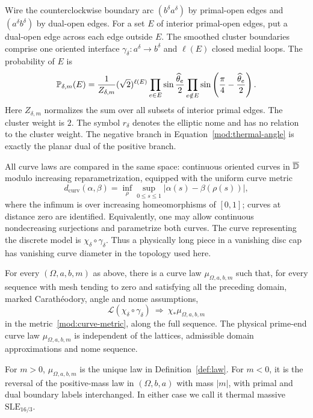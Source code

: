Wire the counterclockwise boundary arc $(b^\delta a^\delta)$ by
primal-open edges and $(a^\delta b^\delta)$ by dual-open edges. For a
set $E$ of interior primal-open edges, put a dual-open edge across each
edge outside $E$. The smoothed cluster boundaries comprise one
oriented interface $\gamma_\delta:a^\delta\to b^\delta$ and
$\ell(E)$ closed medial loops. The probability of $E$ is
\begin{equation}\label{mod:law}
 \mathbb P_{\delta,m}(E)=\frac1{Z_{\delta,m}}(\sqrt2)^{\ell(E)}
 \prod_{e\in E}\sin\frac{\widehat\theta_e}{2}
 \prod_{e\notin E}\sin\left(\frac\pi4-
                                    \frac{\widehat\theta_e}{2}\right).
\end{equation}
Here $Z_{\delta,m}$ normalizes the sum over all subsets of interior
primal edges.
The cluster weight is $2$. The symbol $r_\delta$ denotes the elliptic
nome and has no relation to the cluster weight. The negative branch
in Equation~\eqref{mod:thermal-angle} is exactly the planar dual of
the positive branch.

All curve laws are compared in the same space: continuous oriented
curves in $\overline{\mathbb D}$ modulo increasing reparametrization, equipped
with the uniform curve metric
\begin{equation}\label{mod:curve-metric}
 d_{\mathrm{curv}}(\alpha,\beta)
 =\inf_{\rho}\sup_{0\le s\le1}|\alpha(s)-\beta(\rho(s))|,
\end{equation}
where the infimum is over increasing homeomorphisms of $[0,1]$;
curves at distance zero are identified. Equivalently, one may allow
continuous nondecreasing surjections and parametrize both curves.
The curve representing the discrete model is
$\chi_\delta\circ\gamma_\delta$. Thus a physically long piece in a
vanishing disc cap has vanishing curve diameter in the topology used
here.

\begin{theorem}\label{thm:main}
For every $(\Omega,a,b,m)$ as above, there is a curve law
$\mu_{\Omega,a,b,m}$ such that, for every sequence with mesh tending
to zero and satisfying all the preceding domain, marked
Carath\'eodory, angle and nome assumptions,
\[
 \mathcal L(\chi_\delta\circ\gamma_\delta)
       \ \Longrightarrow\ \chi_*\mu_{\Omega,a,b,m}
\]
in the metric~\eqref{mod:curve-metric}, along the full sequence.
The physical prime-end curve law $\mu_{\Omega,a,b,m}$ is independent
of the lattices, admissible domain approximations and nome sequence.

For $m>0$, $\mu_{\Omega,a,b,m}$ is the unique law in
Definition~\ref{def:law}. For $m<0$, it is the reversal of the
positive-mass law in $(\Omega,b,a)$ with mass $|m|$, with primal and
dual boundary labels interchanged. In either case we call it
thermal massive $\mathrm{SLE}_{16/3}$.
\end{theorem}

